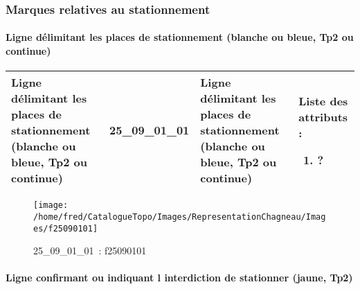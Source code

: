 \documentclass[12pt,titlepage]{book}
\begin{document}
\subsubsection{\large Marques relatives au stationnement}
\paragraph{Ligne délimitant les places de stationnement (blanche ou bleue, Tp2 ou continue)}
\noindent
\vspace{\baselineskip}

\renewcommand{\arraystretch}{1.2}
\begin{supertabular}{|p{10cm}|c|p{13cm}|p{12cm}|}
 Ligne délimitant les places de stationnement (blanche ou bleue, Tp2 ou continue) & 25\_09\_01\_01 & Ligne délimitant les places de stationnement (blanche ou bleue, Tp2 ou continue) & Liste des attributs :
\begin{enumerate}
  \item ?\end{enumerate}
\\
\hline
\end{supertabular}
\begin{figure}[h!]
  \hfill         %
  \begin{minipage}[t]{3cm}
    \begin{center}
      \texttt{[image: /home/fred/CatalogueTopo/Images/RepresentationChagneau/Images/f25090101]}
      \caption[~25\_09\_01\_01]{\small{25\_09\_01\_01~:} \tiny{f25090101}}\label{f25090101}
    \end{center}
  \end{minipage}
\end{figure}


\paragraph{Ligne confirmant ou indiquant l interdiction de stationner (jaune, Tp2)}
\noindent
\vspace{\baselineskip}
\end{document}
